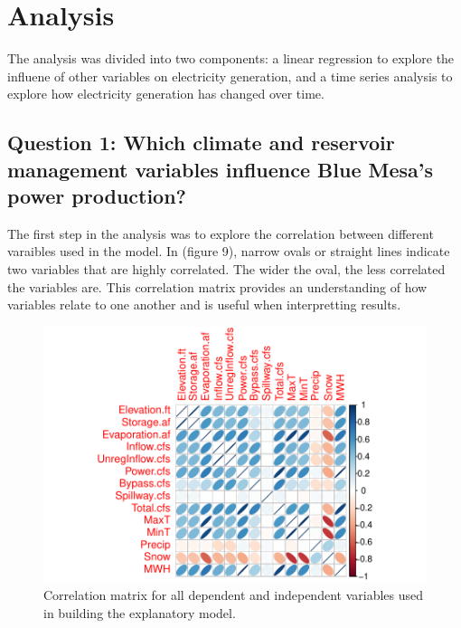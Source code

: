 \documentclass[
  12pt,
]{article}
\begin{document}
\newpage

\hypertarget{analysis}{%
\section{Analysis}\label{analysis}}

The analysis was divided into two components: a linear regression to
explore the influene of other variables on electricity generation, and a
time series analysis to explore how electricity generation has changed
over time.

\hypertarget{question-1-which-climate-and-reservoir-management-variables-influence-blue-mesas-power-production}{%
\subsection{Question 1: Which climate and reservoir management variables
influence Blue Mesa's power
production?}\label{question-1-which-climate-and-reservoir-management-variables-influence-blue-mesas-power-production}}

The first step in the analysis was to explore the correlation between
different varaibles used in the model. In (figure 9), narrow ovals or
straight lines indicate two variables that are highly correlated. The
wider the oval, the less correlated the variables are. This correlation
matrix provides an understanding of how variables relate to one another
and is useful when interpretting results.

\begin{figure}

{\centering \includegraphics{Project_Report_files/figure-latex/correlation-1} 

}

\caption{Correlation matrix for all dependent and independent variables used in building the explanatory model.}\label{fig:correlation}
\end{figure}
\end{document}
